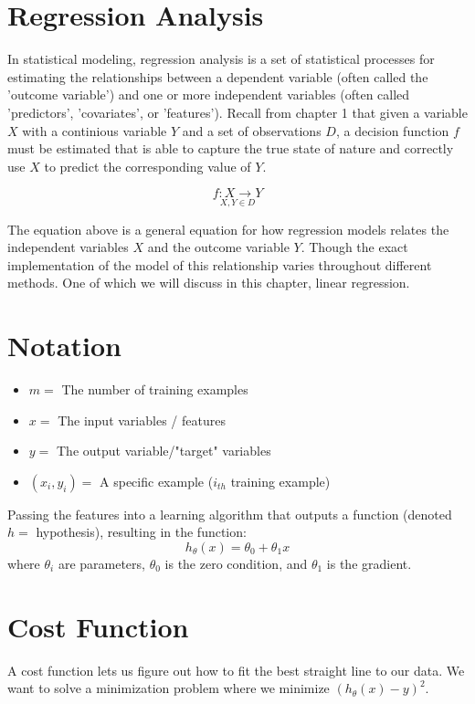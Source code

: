 \section{Regression Analysis}
In statistical modeling, regression analysis is a set of statistical processes 
for estimating the relationships between a dependent variable (often called the 
'outcome variable') and one or more independent variables 
(often called 'predictors', 'covariates', or 'features'). 
\cite{enwiki:regressionanalysis} Recall from chapter 1 that 
given a variable $X$ with a continious variable $Y$ 
and a set of observations $D$, a decision function $f$ must be estimated 
that is able to capture the true state of nature and correctly use $X$ to 
predict the corresponding value of $Y$.  

\begin{equation*}
    \underset{X,Y \in D}{f: X \rightarrow Y}
\end{equation*}

The equation above is a general equation for how regression models relates the
independent variables $X$ and the outcome variable $Y$. Though the exact
implementation of the model of this relationship varies throughout different 
methods. One of which we will discuss in this chapter, linear regression.

\section{Notation}
\begin{itemize}
    \item $m = $ The number of training examples
    \item $x = $ The input variables / features
    \item $y = $ The output variable/"target" variables
    \item $(x_i, y_i) = $ A specific example ($i_{th}$ training example)
\end{itemize}

Passing the features into a learning algorithm that outputs a function (denoted $h = $ hypothesis), resulting in the function:
\[
    h_\theta(x) = \theta_0+\theta_1 x
\]
where $\theta_i$ are parameters, $\theta_0$ is the zero condition, and $\theta_1$ is the gradient.

\section{Cost Function}
A cost function lets us figure out how to fit the best straight line to our data.
We want to solve a minimization problem where we minimize $(h_\theta(x)-y)^2$.

